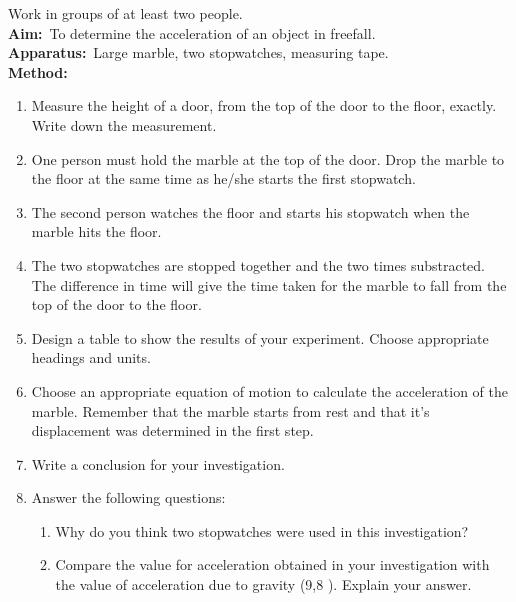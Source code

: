 {%
Work in groups of at least two people.\\
\textbf{Aim:}~To determine the acceleration of an object in freefall.\\
\textbf{Apparatus:}~Large marble, two stopwatches, measuring tape.\\
\textbf{Method:}~\begin{enumerate}
\item Measure the height of a door, from the top of the door to the floor, exactly. Write down the measurement.
\item One person must hold the marble at the top of the door. Drop the marble to the floor at the same time as he/she starts the first stopwatch.
\item The second person watches the floor and starts his stopwatch when the marble hits the floor. 
\item The two stopwatches are stopped together and the two times substracted. The difference in time will give the time taken for the marble to fall from the top of the door to the floor.
\item Design a table to show the results of your experiment. Choose appropriate headings and units.
\item Choose an appropriate equation of motion to calculate the acceleration of the marble. Remember that the marble starts from rest and that it's displacement was determined in the first step.
\item Write a conclusion for your investigation.
\item Answer the following questions:\begin{enumerate}
\item Why do you think two stopwatches were used in this investigation?
\item Compare the value for acceleration obtained in your investigation with the value of acceleration due to gravity (9,8 \mss). Explain your answer.
\end{enumerate}
\end{enumerate}
}

